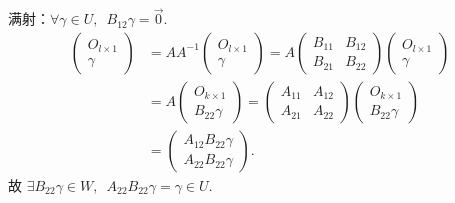 \documentclass[UTF8,12pt,a4paper,fontset=fandol]{ctexart}
\begin{document}
\begin{solve}
            满射：$ \forall \gamma \in U,\enspace B_{12} \gamma = \vec{0} $.
            \begin{align*}
                \begin{pmatrix} O_{l \times 1} \\ \gamma \end{pmatrix}
                & = A A^{-1} \begin{pmatrix} O_{l \times 1} \\ \gamma \end{pmatrix} = A \begin{pmatrix} B_{11} & B_{12} \\ B_{21} & B_{22} \end{pmatrix} \begin{pmatrix} O_{l \times 1} \\ \gamma \end{pmatrix}      \\
                & = A \begin{pmatrix} O_{k \times 1} \\ B_{22} \gamma \end{pmatrix} = \begin{pmatrix} A_{11} & A_{12} \\ A_{21} & A_{22} \end{pmatrix} \begin{pmatrix} O_{k \times 1} \\ B_{22} \gamma \end{pmatrix} \\
                & = \begin{pmatrix} A_{12} B_{22} \gamma \\ A_{22} B_{22} \gamma \end{pmatrix}.
            \end{align*}
            故 $ \exists B_{22} \gamma \in W,\enspace A_{22} B_{22} \gamma = \gamma \in U $.
\end{solve}
\end{document}
